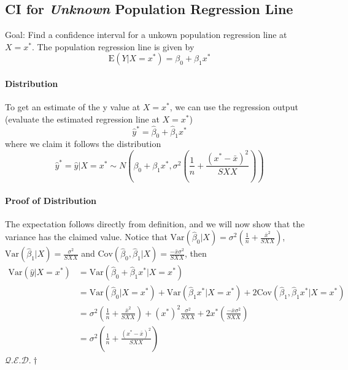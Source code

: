 \documentclass[10pt]{article}
\newcommand{\qed}{\hfill $\mathcal{Q}.\mathcal{E}.\mathcal{D}.\dagger$}
\begin{document}
\subsection{CI for \textit{Unknown} Population Regression Line}
Goal: Find a confidence interval for a unkown population regression line at $X = x^\ast$. The population regression line is given by
\begin{equation*}
    \mathrm{E}\left(Y | X=x^{*}\right)=\beta_{0}+\beta_{1} x^{*}
\end{equation*}
\paragraph{Distribution}
To get an estimate of the y value at $X = x^*$, we can use the regression output (evaluate the estimated regression line at $X = x^*$)
\begin{equation*}
    \hat{y}^{*}=\hat{\beta}_{0}+\hat{\beta}_{1} x^{*}
\end{equation*}
where we claim it follows the distribution
\begin{equation*}
    \hat{y}^{*}=\hat{y} | X=x^{*} \sim N\left(\beta_{0}+\beta_{1} x^{*}, \sigma^{2}\left(\frac{1}{n}+\frac{\left(x^{*}-\bar{x}\right)^{2}}{S X X}\right)\right)
\end{equation*}
\paragraph{Proof of Distribution}
The expectation follows directly from definition, and we will now show that the variance has the claimed value. Notice that $\text{Var}(\hat{\beta}_0|X) = \sigma^2 \left(\frac{1}{n} + \frac{\bar{x}^2}{SXX}\right)$, $\text{Var}(\hat{\beta}_1|X) = \frac{\sigma^2}{SXX}$ and $\text{Cov}(\hat{\beta}_0, \hat{\beta}_1 | X) = \frac{-\bar{x}\sigma^2}{SXX}$, then
\begin{align*}
    \text{Var}(\hat{y}|X = x^*)
    &= \text{Var}( \hat{\beta}_0 + \hat{\beta}_1 x^* |X = x^* ) \\
    &= \text{Var}(\hat{\beta}_0 | X = x^*) + \text{Var}(\hat{\beta}_1 x^* |X = x^*) + 2\text{Cov}(\hat{\beta}_1, \hat{\beta}_1 x^* | X = x^*) \\
    &= \sigma^2 \left(\frac{1}{n} + \frac{\bar{x}^2}{SXX}\right) + (x^*)^2 \frac{\sigma^2}{SXX} + 2x^* \left(\frac{-\bar{x}\sigma^2}{SXX}\right) \\
    &= \sigma^{2}\left(\frac{1}{n}+\frac{\left(x^{*}-\bar{x}\right)^{2}}{S X X}\right)
\end{align*}
\hfill \qed
\end{document}
